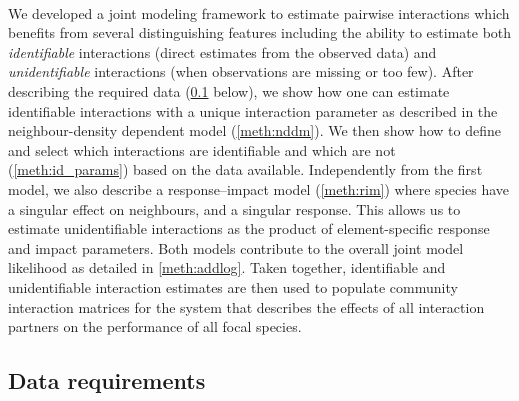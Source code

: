 \documentclass[a4,12pt]{article}
\begin{document}
\begin{refsection}
\paragraph{} 
We developed a joint modeling framework to estimate pairwise interactions which benefits from several distinguishing features including the ability to estimate both \textit{identifiable} interactions (direct estimates from the observed data) and \textit{unidentifiable} interactions (when observations are missing or too few). After describing the required data (\ref{meth:data} below), we show how one can estimate identifiable interactions with a unique interaction parameter as described in the neighbour-density dependent model (\ref{meth:nddm}).
We then show how to define and select which interactions are identifiable and which are not (\ref{meth:id_params}) based on the data available. Independently from the first model, we also describe a response--impact model (\ref{meth:rim}) where species have a singular effect on neighbours, and a singular response. This allows us to estimate unidentifiable interactions as the product of element-specific response and impact parameters. Both models contribute to the overall joint model likelihood as detailed in \ref{meth:addlog}.
Taken together, identifiable and unidentifiable interaction estimates are then used to populate community interaction matrices for the system that describes the effects of all interaction partners on the performance of all focal species. 




    \subsection{Data requirements}
    \label{meth:data}


\end{refsection}
\end{document}
